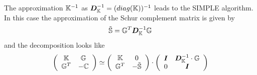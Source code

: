 The approximation ${\mathbb{K}}^{-1}$ as ${\bm D}_{\mathbb{K}}^{-1} = (diag({\mathbb{K}}))^{-1}$ leads to the 
SIMPLE algorithm. In this case the approximation of the Schur complement matrix is given by
\[
\tilde{{\mathbb{S}}} = {\mathbb{G}}^T {\bm D}_{\mathbb{K}}^{-1} {\mathbb{G}}
\]
and the decomposition looks like
\[
\left(
\begin{array}{cc}
{\mathbb{K}} & {\mathbb{G}} \\ {\mathbb{G}}^T & -{\mathbb{C}} 
\end{array}
\right)
\simeq
\left(
\begin{array}{cc}
{\mathbb{K}} & 0 \\ 
{\mathbb{G}}^T & -\tilde{{\mathbb{S}}}
\end{array}
\right)
\cdot
\left(
\begin{array}{cc}
{\bm I} & {\bm D}_{\mathbb{K}}^{-1} \cdot {\mathbb{G}} \\
0 & {\bm I} 
\end{array}
\right)
\]

